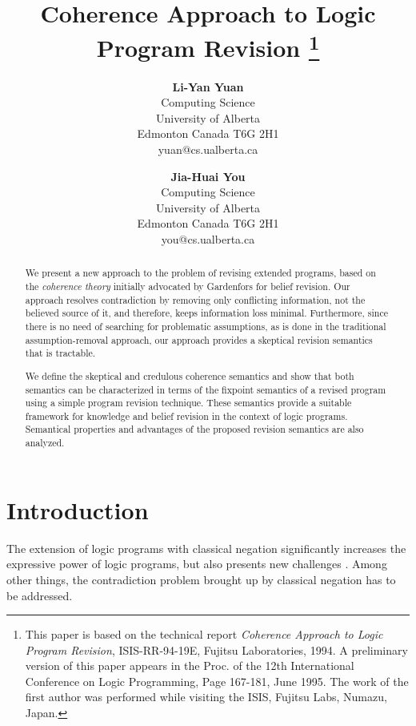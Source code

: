 
\title{\LARGE \bf Coherence Approach to Logic Program Revision
\thanks{
This paper is based on the technical report 
{\em Coherence Approach to Logic Program Revision},
ISIS-RR-94-19E, Fujitsu Laboratories, 1994.
A preliminary version of this paper appears in the
Proc. of the 12th International Conference on Logic Programming, Page
167-181, June 1995.
The work of the first author was performed while visiting
the ISIS, Fujitsu Labs, Numazu, Japan.}}
\author{{\bf Li-Yan Yuan} \\
{\small Computing Science} \\
{\small University of Alberta}\\
{\small Edmonton Canada T6G 2H1} \\
{\small yuan@cs.ualberta.ca }\\
\and {\bf Jia-Huai You} \\
{\small Computing Science} \\
{\small University of Alberta} \\
{\small Edmonton Canada T6G 2H1} \\
{\small you@cs.ualberta.ca} \\
}
\maketitle
\begin{abstract} 
We present a new approach to the problem of 
revising extended programs, based on the {\em coherence theory}
initially advocated by Gardenfors for belief revision.
Our approach resolves contradiction by removing only conflicting
information, not the believed source of it, and therefore, keeps
information loss minimal. Furthermore, since there is
no need of searching for problematic assumptions, as is done in the
traditional assumption-removal approach, our approach provides a
skeptical revision semantics that is tractable.

We define the skeptical and credulous coherence semantics
and show that both semantics can be characterized 
in terms of the fixpoint semantics of a revised program using a 
simple program revision technique. 
These semantics provide a suitable framework for knowledge and belief
revision in the context of logic programs.
Semantical properties and advantages 
of the proposed revision semantics are also analyzed.
\end{abstract}

\section{Introduction}
The extension of logic programs with classical negation
significantly  increases the
expressive power of logic programs, but also presents new challenges
\cite{gelfondlifschitz90}.
Among other things, the contradiction problem brought up
by classical negation has to be addressed.

